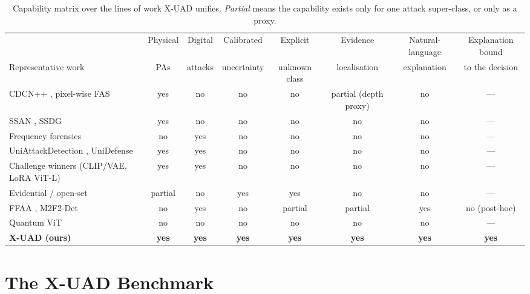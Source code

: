 \documentclass[conference]{IEEEtran}
\begin{document}
\begin{table}[t]
\centering
\caption{Capability matrix over the lines of work X-UAD unifies. \emph{Partial}
means the capability exists only for one attack super-class, or only as a proxy.}
\label{tab:gap}
\footnotesize
\setlength{\tabcolsep}{4pt}
\begin{tabular}{lccccccc}
\toprule
 & Physical & Digital & Calibrated & Explicit & Evidence & Natural-language & Explanation bound \\
Representative work & PAs & attacks & uncertainty & unknown class & localisation & explanation & to the decision \\
\midrule
CDCN++ \cite{yu2020cdcn}, pixel-wise FAS \cite{yu2021revisiting} & yes & no & no & no & partial (depth proxy) & no & --- \\
SSAN \cite{wang2022ssan}, SSDG \cite{jia2020ssdg} & yes & no & no & no & no & no & --- \\
Frequency forensics \cite{frank2020frequency,wang2020cnnspot} & no & yes & no & no & no & no & --- \\
UniAttackDetection \cite{yu2024unified}, UniDefense \cite{zhang2024unidefense} & yes & yes & no & no & no & no & --- \\
Challenge winners \cite{ma2025uniattackplus} (CLIP/VAE, LoRA ViT-L) & yes & yes & no & no & no & no & --- \\
Evidential / open-set \cite{sensoy2018edl,liu2024openset} & partial & no & yes & yes & no & no & --- \\
FFAA \cite{huang2024ffaa}, M2F2-Det \cite{guo2025m2f2det} & no & yes & no & partial & partial & yes & no (post-hoc) \\
Quantum ViT \cite{cherrat2024qvt,evans2025on} & no & no & no & no & no & no & --- \\
\midrule
\textbf{X-UAD (ours)} & \textbf{yes} & \textbf{yes} & \textbf{yes} & \textbf{yes} & \textbf{yes} & \textbf{yes} & \textbf{yes} \\
\bottomrule
\end{tabular}
\end{table}

\section{The X-UAD Benchmark}\label{sec:bench}
\end{document}

